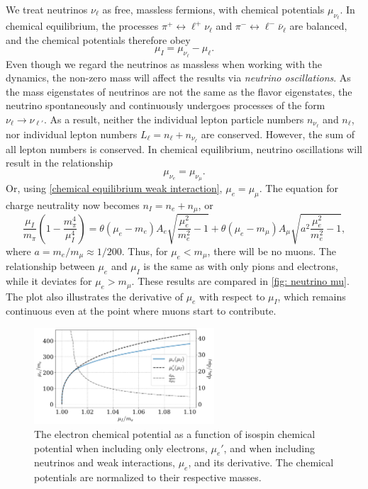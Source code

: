 We treat neutrinos $\nu_\ell$ as free, massless fermions, with chemical potentials $\mu_{\nu_\ell}$.
In chemical equilibrium, the processes $\pi^+ \leftrightarrow \ell^+ \nu_\ell $ and $\pi^- \leftrightarrow \ell^- \bar\nu_\ell $ are balanced, and the chemical potentials therefore obey
%
\begin{equation}
    \label{chemical equilibrium weak interaction}
    \mu_I = \mu_{\nu_\ell} - \mu_\ell.
\end{equation}
%
Even though we regard the neutrinos as massless when working with the dynamics, the non-zero mass will affect the results via \emph{neutrino oscillations}.
As the mass eigenstates of neutrinos are not the same as the flavor eigenstates, the neutrino spontaneously and continuously undergoes processes of the form $\nu_\ell \rightarrow \nu_{\ell'}$.
As a result, neither the individual lepton particle numbers $n_{\nu_\ell}$ and $n_{\ell}$, nor individual lepton numbers $L_\ell = n_\ell + n_{\nu_\ell}$ are conserved.
However, the sum of all lepton numbers is conserved.
In chemical equilibrium, neutrino oscillations will result in the relationship
%
\begin{equation}
    \mu_{\nu_e} = \mu_{\nu_\mu}.
\end{equation}
%
Or, using \autoref{chemical equilibrium weak interaction}, $\mu_e = \mu_\mu$.
The equation for charge neutrality now becomes $n_I = n_e + n_\mu$, or
%
\begin{equation}
    \label{chemical potential relationship neutrinos}
    \frac{\mu_I}{m_\pi} \left(1 - \frac{m_\pi^4}{\mu_I^4}\right)
    =
    \theta(\mu_e - m_e) 
    A_e \sqrt{\frac{\mu_e^2}{m_e^2} - 1}
    +
    \theta(\mu_e - m_\mu)
    A_\mu \sqrt{a^2 \frac{\mu_e^2}{m_e^2} - 1},
\end{equation}
%
where $a = m_e/m_\mu \approx 1 / 200$.
Thus, for $\mu_e < m_\mu$, there will be no muons. 
The relationship between $\mu_e$ and $\mu_I$ is the same as with only pions and electrons, while it deviates for $\mu_e > m_\mu$.
These results are compared in \autoref{fig: neutrino mu}.
The plot also illustrates the derivative of $\mu_e$ with respect to $\mu_I$, which remains continuous even at the point where muons start to contribute.

\begin{figure}[!htb]
    \centering
    \includegraphics[width=0.6\textwidth]{../scripts/figurer/neutrino_mu.pdf}
    \caption{
        The electron chemical potential as a function of isospin chemical potential when including only electrons, $\mu_e'$, and when including neutrinos and weak interactions, $\mu_e$, and its derivative.
        The chemical potentials are normalized to their respective masses.
    }
    \label{fig: neutrino mu}
\end{figure}


